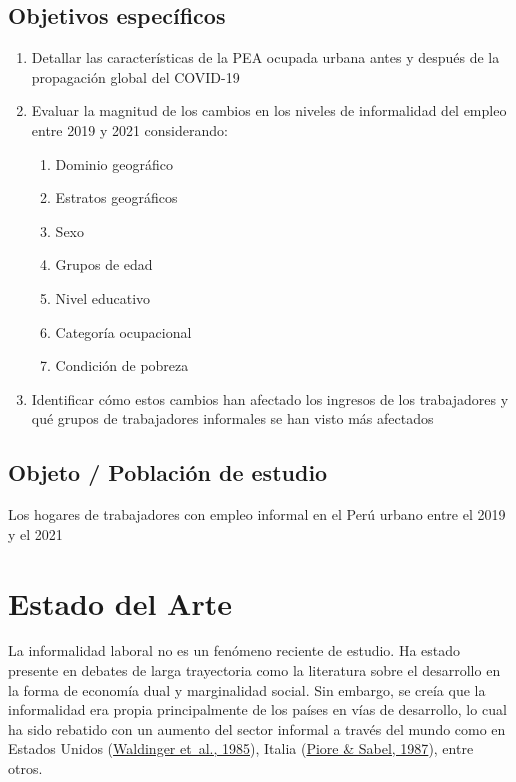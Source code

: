 \documentclass[
  letterpaper,
  12pt,
  oneside,
  spanish,
  doublespacing,
  headsepline,
  parskip]{MastersDoctoralThesis}
\begin{document}
\hypertarget{objetivos-especuxedficos}{%
\section{Objetivos específicos}\label{objetivos-especuxedficos}}

\begin{enumerate}
\def\labelenumi{\arabic{enumi}.}
\item
  Detallar las características de la PEA ocupada urbana antes y después
  de la propagación global del COVID-19
\item
  Evaluar la magnitud de los cambios en los niveles de informalidad del
  empleo entre 2019 y 2021 considerando:

  \begin{enumerate}
  \def\labelenumii{\roman{enumii}.}
  \item
    Dominio geográfico
  \item
    Estratos geográficos
  \item
    Sexo
  \item
    Grupos de edad
  \item
    Nivel educativo
  \item
    Categoría ocupacional
  \item
    Condición de pobreza
  \end{enumerate}
\item
  Identificar cómo estos cambios han afectado los ingresos de los
  trabajadores y qué grupos de trabajadores informales se han visto más
  afectados
\end{enumerate}

\hypertarget{objeto-poblaciuxf3n-de-estudio}{%
\section{Objeto / Población de
estudio}\label{objeto-poblaciuxf3n-de-estudio}}

Los hogares de trabajadores con empleo informal en el Perú urbano entre
el 2019 y el 2021


\hypertarget{sec-estado}{%
\chapter{Estado del Arte}\label{sec-estado}}

La informalidad laboral no es un fenómeno reciente de estudio. Ha estado
presente en debates de larga trayectoria como la literatura sobre el
desarrollo en la forma de economía dual y marginalidad social. Sin
embargo, se creía que la informalidad era propia principalmente de los
países en vías de desarrollo, lo cual ha sido rebatido con un aumento
del sector informal a través del mundo como en Estados Unidos
(\protect\hyperlink{ref-waldinger1985}{Waldinger et~al., 1985}), Italia
(\protect\hyperlink{ref-piore1987}{Piore \& Sabel, 1987}), entre otros.
\end{document}
